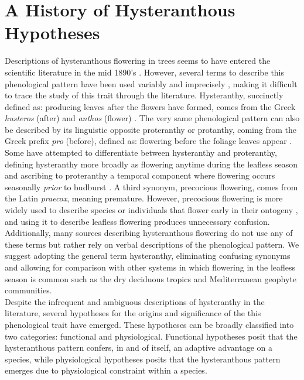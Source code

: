 \documentclass{article}
\begin{document}
\section*{A History of Hysteranthous Hypotheses}
\indent Descriptions of hysteranthous flowering in trees seems to have entered the scientific literature in the mid 1890's \citep{Robertson1895}. However, several terms to describe this phenological pattern have been used variably and imprecisely \citep{Dyer1953}, making it difficult to trace the study of this trait through the literature. Hysteranthy, succinctly defined as: producing leaves after the flowers have formed, comes from the Greek \textit{husteros} (after) and \textit{anthos} (flower) \citep{Heinig1899}. The very same phenological pattern can also be described by its linguistic opposite proteranthy or protanthy, coming from the Greek prefix \textit{pro} (before), defined as: flowering before the foliage leaves appear \citep{Heinig1899}. Some have attempted to differentiate between hysteranthy and proteranthy, defining hysteranthy more broadly as flowering anytime during the leafless season and ascribing to proteranthy a temporal component where flowering occurs seasonally \textit{prior} to budburst \citep{Lamont2011}.  A third synonym, precocious flowering, comes from the Latin \textit{praecox}, meaning premature\citep{Heinig1899}. However, precocious flowering is more widely used to describe species or individuals that flower early in their ontogeny \citep*{Seleznyova2008,Pharis1965}, and using it to describe leafless flowering produces unnecessary confusion. Additionally, many sources describing hysteranthous flowering do not use any of these terms but rather rely on verbal descriptions of the phenological pattern. We suggest adopting the general term hysteranthy, eliminating confusing synonyms and allowing for comparison with other systems in which flowering in the leafless season is common such as the dry deciduous tropics \cite{Franklin2016} and Mediterranean geophyte communities\citep{Marques2012}.\\
\indent Despite the infrequent and ambiguous descriptions of hysteranthy in the literature, several hypotheses for the origins and significance of the this phenological trait have emerged. These hypotheses can be broadly classified into two categories: functional and physiological. Functional hypotheses posit that the hysteranthous pattern confers, in and of itself, an adaptive advantage on a species, while physiological hypotheses posits that the hysteranthous pattern emerges due to physiological constraint within a species.\\
\end{document}
